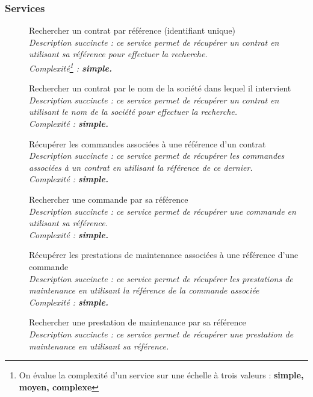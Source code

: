 \subsubsection{Services}

\begin{description}
    \item[\textbullet] Rechercher un contrat par référence (identifiant unique) \\
        \it{Description succincte :} ce service permet de récupérer un contrat en utilisant sa référence pour effectuer la recherche. \\
        \it{Complexité\footnote{On évalue la complexité d’un service sur une échelle à trois valeurs : \bf{simple}, \bf{moyen}, \bf{complexe}} :} \bf{simple}.
    \item[\textbullet] Rechercher un contrat par le nom de la société dans lequel il intervient \\
        \it{Description succincte :} ce service permet de récupérer un contrat en utilisant le nom de la société pour effectuer la recherche. \\
        \it{Complexité :} \bf{simple}.
    \item[\textbullet] Récupérer les commandes associées à une référence d’un contrat  \\
        \it{Description succincte :} ce service permet de récupérer les commandes associées à un contrat en utilisant la référence de ce dernier. \\
        \it{Complexité :} \bf{simple}.
    \item[\textbullet] Rechercher une commande par sa référence \\
        \it{Description succincte :} ce service permet de récupérer une commande en utilisant sa référence. \\
        \it{Complexité :} \bf{simple}.
    \item[\textbullet] Récupérer les prestations de maintenance associées à une référence d’une commande \\
        \it{Description succincte :} ce service permet de récupérer les prestations de maintenance en utilisant la référence de la commande associée  \\
        \it{Complexité :} \bf{simple}. 
    \item[\textbullet] Rechercher une prestation de maintenance par sa référence \\
        \it{Description succincte :} ce service permet de récupérer une prestation de maintenance en utilisant sa référence. \\

\end{description}
